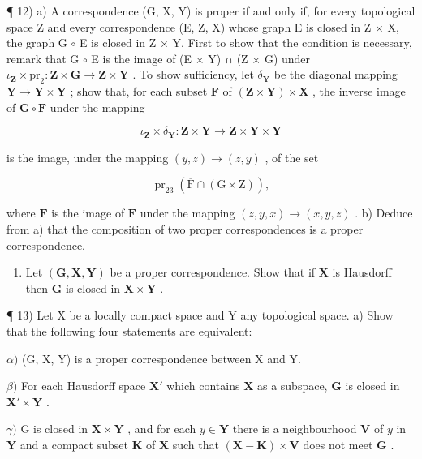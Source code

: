¶ 12) a) A correspondence (G, X, Y) is proper if and only if, for every topological space Z and every correspondence (E, Z, X) whose graph E is closed in Z × X, the graph G \(\circ\) E is closed in Z × Y. First to show that the condition is necessary, remark that G \(\circ\) E is the image of (E × Y) ∩ (Z × G) under \(\iota_{\mathbf{Z}} \times \mathrm{pr}_{2} : \mathbf{Z} \times \mathbf{G} \to \mathbf{Z} \times \mathbf{Y}\) . To show sufficiency, let \(\delta_{\mathbf{Y}}\) be the diagonal mapping \(\mathbf{Y} \to \mathbf{Y} \times \mathbf{Y}\) ; show that, for each subset \(\mathbf{F}\) of \((\mathbf{Z} \times \mathbf{Y}) \times \mathbf{X}\) , the inverse image of \(\mathbf{G} \circ \mathbf{F}\) under the mapping

\[
\iota_ {\mathbf {Z}} \times \delta_ {\mathbf {Y}}: \mathbf {Z} \times \mathbf {Y} \rightarrow \mathbf {Z} \times \mathbf {Y} \times \mathbf {Y}
\]

is the image, under the mapping \((y, z) \to (z, y)\) , of the set

\[
\operatorname{pr} _ {2 3} (\overline {{{\mathrm{F}}}} \cap (\mathrm{G} \times \mathrm{Z})),
\]

where \(\mathbf{F}\) is the image of \(\mathbf{F}\) under the mapping \((z, y, x) \to (x, y, z)\) . b) Deduce from a) that the composition of two proper correspondences is a proper correspondence.

\begin{enumerate}
\def\labelenumi{\alph{enumi})}
\setcounter{enumi}{2}
\tightlist
\item
  Let \((\mathbf{G},\mathbf{X},\mathbf{Y})\) be a proper correspondence. Show that if \(\mathbf{X}\) is Hausdorff then \(\mathbf{G}\) is closed in \(\mathbf{X} \times \mathbf{Y}\) .
\end{enumerate}

¶ 13) Let X be a locally compact space and Y any topological space. a) Show that the following four statements are equivalent:

\(\alpha)\) (G, X, Y) is a proper correspondence between X and Y.

\(\beta)\) For each Hausdorff space \(\mathbf{X}'\) which contains \(\mathbf{X}\) as a subspace, \(\mathbf{G}\) is closed in \(\mathbf{X}' \times \mathbf{Y}\) .

\(\gamma)\) G is closed in \(\mathbf{X} \times \mathbf{Y}\) , and for each \(y \in \mathbf{Y}\) there is a neighbourhood \(\mathbf{V}\) of \(y\) in \(\mathbf{Y}\) and a compact subset \(\mathbf{K}\) of \(\mathbf{X}\) such that \((\mathbf{X} - \mathbf{K}) \times \mathbf{V}\) does not meet \(\mathbf{G}\) .

